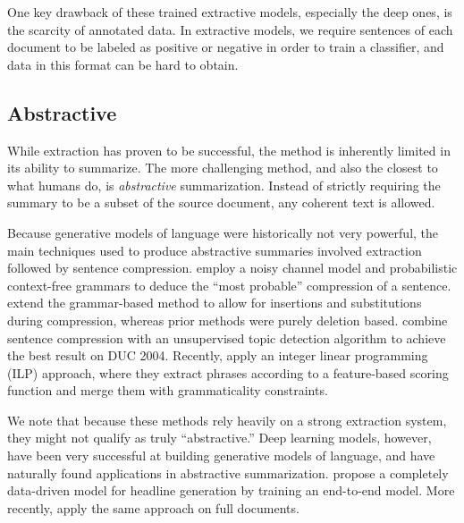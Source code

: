 \documentclass[12pt]{report}
\begin{document}
One key drawback of these trained extractive models, especially the deep ones, is the scarcity of annotated data. In extractive models, we require sentences of each document to be labeled as positive or negative in order to train a classifier, and data in this format can be hard to obtain.

%
% 




\subsection{Abstractive} While extraction has proven to be successful, the method is inherently limited in its ability to summarize. The more challenging method, and also the closest to what humans do, is \emph{abstractive} summarization. Instead of strictly requiring the summary to be a subset of the source document, any coherent text is allowed.

Because generative models of language were historically not very powerful, the main techniques used to produce abstractive summaries involved extraction followed by sentence compression.
 \citet{knight2002summarization} employ a noisy channel model and probabilistic context-free grammars to deduce the ``most probable'' compression of a sentence.
\citet{cohn2008sentence} extend the grammar-based method to allow for insertions and substitutions during compression, whereas prior methods were purely deletion based.
\citet{zajic2004topiary} combine sentence compression with an unsupervised topic detection algorithm to achieve the best result on DUC 2004.
Recently, \citet{Durrett2016} apply an integer linear programming (ILP) approach, where they extract phrases according to a feature-based scoring function and merge them with grammaticality constraints.


We note that because these methods rely heavily on a strong extraction system, they might not qualify as truly ``abstractive.'' Deep learning models, however, have been very successful at building generative models of language, and have naturally found applications in abstractive summarization. \citet{rush2015neural} propose a completely data-driven model for headline generation by training an end-to-end model. More recently, \citet{nallapati2016seq2seq} apply the same approach on full documents.
\end{document}
